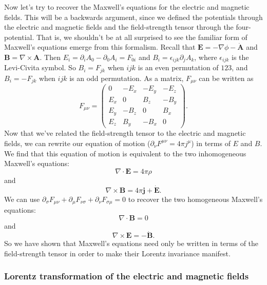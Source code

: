\documentclass{article}
\begin{document}
Now let's try to recover the Maxwell's equations for the electric and magnetic fields. This will be a backwards argument, since we defined the potentials through the electric and magnetic fields and the field-strength tensor through the four-potential. That is, we shouldn't be at all surprised to see the familiar form of Maxwell's equations emerge from this formalism. Recall that $ \mathbf{E} = - \nabla \phi - \dot{\mathbf{A}}$ and $\mathbf{B} = \nabla \times \mathbf{A}$. Then $E_i = \partial_i A_0 - \partial_0 A_i  = F_{0i}$ and $B_i = \epsilon_{ijk} \partial_j A_k$, where $\epsilon_{ijk}$ is the Levi-Civita symbol. So $B_i = F_{jk}$ when $ijk$ is an even permutation of $123$, and $B_i = -F_{jk}$ when $ijk$ is an odd permutation. As a matrix, $F_{\mu \nu}$ can be written as 
\begin{equation} 
F_{\mu \nu} = \left( \begin{array}{cccc}
0 & -E_x & -E_y & -E_z \\
E_x & 0 & B_z & -B_y \\
E_y & -B_z & 0 & B_x \\
E_z & B_y & -B_x & 0 
\end{array} \right) .
\end{equation}
Now that we've related the field-strength tensor to the electric and magnetic fields, we can rewrite our equation of motion ($\partial_\nu F^{\mu \nu} = 4 \pi j^\mu$) in terms of $E$ and $B$. We find that this equation of motion is equivalent to the two inhomogeneous Maxwell's equations: \begin{equation} \nabla \cdot \mathbf{E} = 4 \pi \rho \end{equation} and \begin{equation} \nabla \times \mathbf{B} = 4 \pi \mathbf{j} + \dot{\mathbf{E}} . \end{equation} We can use $ \partial_\sigma F_{\mu \nu} + \partial_\mu F_{\nu \sigma} + \partial_\nu F_{\sigma \mu} = 0 $ to recover the two homogeneous Maxwell's equations: \begin{equation} \nabla \cdot \mathbf{B} = 0 \end{equation} and \begin{equation} \nabla \times \mathbf{E} = - \dot{\mathbf{B}} . \end{equation} So we have shown that Maxwell's equations need only be written in terms of the field-strength tensor in order to make their Lorentz invariance manifest.

\subsubsection*{Lorentz transformation of the electric and magnetic fields}
\end{document}
